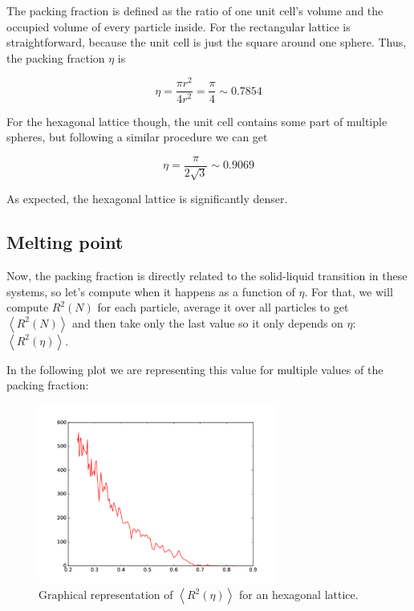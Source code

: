 \documentclass[10 pt]{article}
\newcommand{\avg}[1]{\left\langle #1 \right\rangle}
\begin{document}
The packing fraction is defined as the ratio of one unit cell's volume and the occupied volume of every particle inside. For the rectangular lattice is straightforward, because the unit cell is just the square around one sphere. Thus, the packing fraction $\eta$ is

$$ \eta = \frac{\pi r^2}{4 r^2} = \frac{\pi}{4} \sim 0.7854 $$

For the hexagonal lattice though, the unit cell contains some part of multiple spheres, but following a similar procedure we can get

$$ \eta = \frac{\pi}{2\sqrt{3}} \sim 0.9069 $$

As expected, the hexagonal lattice is significantly denser.

\subsection{Melting point}

Now, the packing fraction is directly related to the solid-liquid transition in these systems, so let's compute when it happens as a function of $\eta$. For that, we will compute $R^2(N)$ for each particle, average it over all particles to get $\avg{R^2(N)}$ and then take only the last value so it only depends on $\eta$: $\avg{R^2(\eta)}$.

In the following plot we are representing this value for multiple values of the packing fraction:

\begin{figure}[H]
  \begin{center}
    \includegraphics[width=0.7\textwidth]{../graphs/hexa-melting.pdf}
    \caption{Graphical representation of $\avg{R^2(\eta)}$ for an hexagonal lattice.}
  \end{center}
\end{figure}
\end{document}
